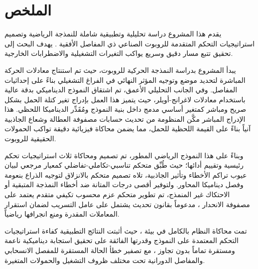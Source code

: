 \chapter*{الملخص}

يقدم هذا المشروع دراسة تحليلية وتطبيقية شاملة للنمذجة الرياضية وتصميم استراتيجيات التحكم المتقدمة للروبوت الصناعي ذي المفاصل الأفقية .     يهدف البحث إلى تحقيق تتبع مسار دقيق وسريع يواكب التغيرات التشغيلية والاضطرابات الخارجية.

يبدأ المشروع بدراسة النمذجة الحركية  للروبوت، حيث تم استنتاج معادلات الحركة المباشرة  لتحديد موضع وتوجيه المؤثر النهائي في الفراغ التشغيلي بناءً على إحداثيات المفاصل. وفي الجانب التحليلي الأعمق، تم اشتقاق النموذج الديناميكي بدقة عالية باستخدام معادلات لاغرانج-أويلر، حيث يتميز هذا العمل بإدراج تغير كتلة الحمل  بشكل صريح ومباشر كمتغير أساسي مدمج داخل بنية النموذج ومُقَدِّر الديناميكا اللحظي. هذا الإدراج المباشر مكَّن المنظومة من تحديث حسابات مصفوفة العطالة وشعاع الجاذبية آنياً بناءً على القيمة اللحظية للحمل، مما يضمن محاكاة فيزيائية دقيقة تواكب الحمولات الحقيقية للروبوت.

وبناءً على هذا النموذج الرياضي المطور، تم تصميم ومحاكاة ثلاث استراتيجيات تحكم رئيسية وتقييم أدائها؛ حيث طُبِّق متحكم تناسبي-تكاملي-تفاضلي  كمعيار مرجعي لبيان عيوب تراكم الأخطاء وتأثير الجاذبية، تلاه تصميم متحكم بالانزلاق  لتوجيه الذراع بنعومة وفصل ديناميكا المحاور. ولتوفير أقصى درجات المتانة ضد أخطاء النمذجة المتبقية أو الاحتكاك غير المنمذج، تم تطوير متحكم عزم محسوب تكيفي متقدم يعتمد على مصفوفة الانحدار ، مدعوماً بقانون تحديث يشتمل على عامل التسريب  لضمان استقرار المعاملات المقدرة ومنع انجرافها رياضياً.

تمت محاكاة النظام بالكامل في بيئة ، حيث أثبتت النتائج التطبيقية كفاءة استراتيجيات التحكم المعتمدة على النموذج  وقدرتها الفائقة على تحقيق استجابة ديناميكية ناعمة ومستقرة تماماً بدون تجاوز ، مع تصفير خطأ الحالة المستقرة للمفصل الانسحابي والمفاصل الدورانية تحت مختلف ظروف التشغيل والحمولات المتغيرة.